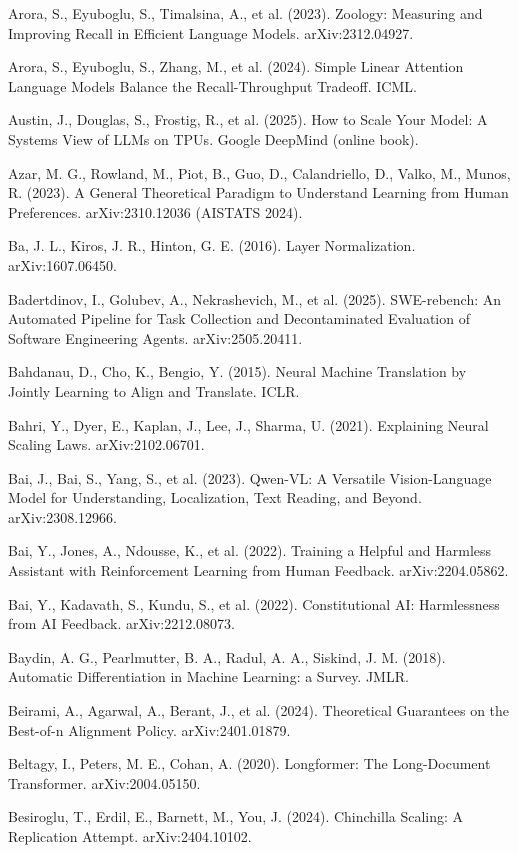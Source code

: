 {\begin{enumerate}[leftmargin=*,itemsep=1pt,label={[\arabic*]}]
\item Arora, S., Eyuboglu, S., Timalsina, A., et al. (2023). Zoology: Measuring and Improving Recall in Efficient Language Models. arXiv:2312.04927.
\item Arora, S., Eyuboglu, S., Zhang, M., et al. (2024). Simple Linear Attention Language Models Balance the Recall-Throughput Tradeoff. ICML.
\item Austin, J., Douglas, S., Frostig, R., et al. (2025). How to Scale Your Model: A Systems View of LLMs on TPUs. Google DeepMind (online book).
\item Azar, M. G., Rowland, M., Piot, B., Guo, D., Calandriello, D., Valko, M., Munos, R. (2023). A General Theoretical Paradigm to Understand Learning from Human Preferences. arXiv:2310.12036 (AISTATS 2024).
\item Ba, J. L., Kiros, J. R., Hinton, G. E. (2016). Layer Normalization. arXiv:1607.06450.
\item Badertdinov, I., Golubev, A., Nekrashevich, M., et al. (2025). SWE-rebench: An Automated Pipeline for Task Collection and Decontaminated Evaluation of Software Engineering Agents. arXiv:2505.20411.
\item Bahdanau, D., Cho, K., Bengio, Y. (2015). Neural Machine Translation by Jointly Learning to Align and Translate. ICLR.
\item Bahri, Y., Dyer, E., Kaplan, J., Lee, J., Sharma, U. (2021). Explaining Neural Scaling Laws. arXiv:2102.06701.
\item Bai, J., Bai, S., Yang, S., et al. (2023). Qwen-VL: A Versatile Vision-Language Model for Understanding, Localization, Text Reading, and Beyond. arXiv:2308.12966.
\item Bai, Y., Jones, A., Ndousse, K., et al. (2022). Training a Helpful and Harmless Assistant with Reinforcement Learning from Human Feedback. arXiv:2204.05862.
\item Bai, Y., Kadavath, S., Kundu, S., et al. (2022). Constitutional AI: Harmlessness from AI Feedback. arXiv:2212.08073.
\item Baydin, A. G., Pearlmutter, B. A., Radul, A. A., Siskind, J. M. (2018). Automatic Differentiation in Machine Learning: a Survey. JMLR.
\item Beirami, A., Agarwal, A., Berant, J., et al. (2024). Theoretical Guarantees on the Best-of-n Alignment Policy. arXiv:2401.01879.
\item Beltagy, I., Peters, M. E., Cohan, A. (2020). Longformer: The Long-Document Transformer. arXiv:2004.05150.
\item Besiroglu, T., Erdil, E., Barnett, M., You, J. (2024). Chinchilla Scaling: A Replication Attempt. arXiv:2404.10102.

\end{enumerate}}
